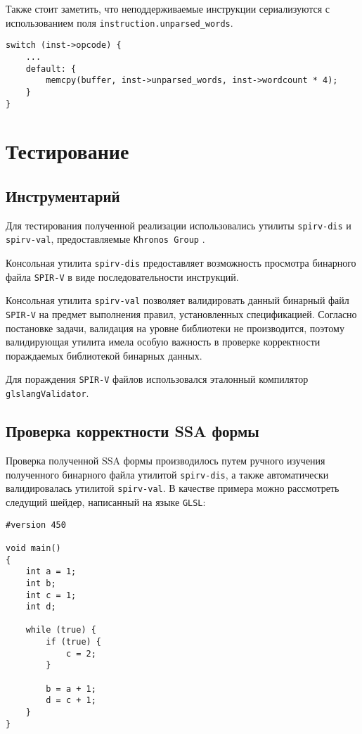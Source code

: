 \documentclass[14pt]{extarticle}
\begin{document}
Также стоит заметить, что неподдерживаемые инструкции сериализуются с использованием поля \texttt{instruction.unparsed\_words}.
\begin{lstlisting}[caption={сериализация неподдерживаемых инструкций}]
switch (inst->opcode) {
    ...
    default: {
        memcpy(buffer, inst->unparsed_words, inst->wordcount * 4);
    }
}
\end{lstlisting}

\newpage
\section{Тестирование}
\subsection{Инструментарий}
Для тестирования полученной реализации использовались утилиты \texttt{spirv-dis} и \texttt{spirv-val}, предоставляемые \texttt{Khronos Group} \cite{tools19}.

Консольная утилита \texttt{spirv-dis} предоставляет возможность просмотра бинарного файла \texttt{SPIR-V} в виде последовательности инструкций.

Консольная утилита  \texttt{spirv-val} позволяет валидировать данный бинарный файл \texttt{SPIR-V} на предмет выполнения правил, установленных спецификацией. Согласно постановке задачи, валидация на уровне библиотеки не производится, поэтому валидирующая утилита имела особую важность в проверке корректности пораждаемых библиотекой бинарных данных.

Для пораждения \texttt{SPIR-V} файлов использовался эталонный компилятор\\
\texttt{glslangValidator}.
\subsection{Проверка корректности SSA формы}
Проверка полученной SSA формы производилось путем ручного изучения полученного бинарного файла утилитой \texttt{spirv-dis}, а также автоматически валидировалась утилитой \texttt{spirv-val}. В качестве примера можно рассмотреть следущий шейдер, написанный на языке \texttt{GLSL}:
\begin{lstlisting}[caption={код шейдера на языке \texttt{GLSL}}]
#version 450

void main()
{
    int a = 1;
    int b;
    int c = 1;
    int d;
    
    while (true) {
        if (true) {
            c = 2;
        }
        
        b = a + 1;
        d = c + 1;
    }
}
\end{lstlisting}
~\\ %
\end{document}
